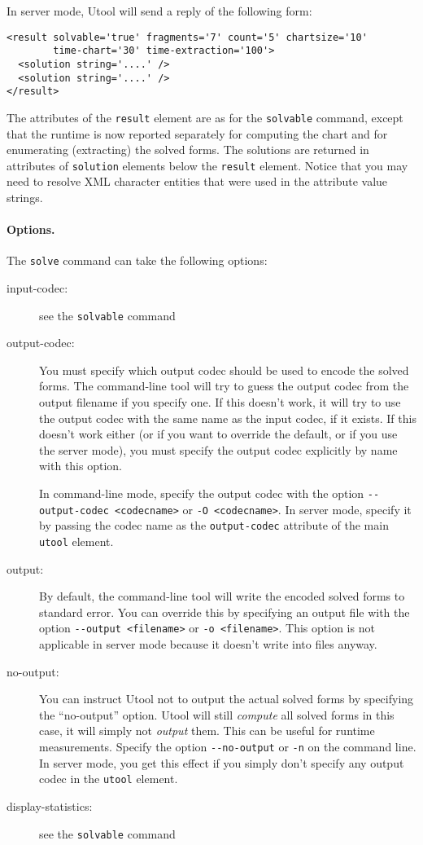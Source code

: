 In server mode, Utool will send a reply of the following form:
\begin{verbatim}
<result solvable='true' fragments='7' count='5' chartsize='10'
        time-chart='30' time-extraction='100'>
  <solution string='....' />
  <solution string='....' />
</result>
\end{verbatim}

The attributes of the \verb?result? element are as for the
\verb?solvable? command, except that the runtime is now reported
separately for computing the chart and for enumerating (extracting)
the solved forms. The solutions are returned in attributes of
\verb?solution? elements below the \verb?result? element. Notice that
you may need to resolve XML character entities that were used in the
attribute value strings.

\paragraph{Options.}
The \verb?solve? command can take the following options:
\begin{description}
\item[input-codec:] see the \verb?solvable? command
\item[output-codec:] You must specify which output codec should be
used to encode the solved forms. The command-line tool will try to
guess the output codec from the output filename if you specify one. If
this doesn't work, it will try to use the output codec with the same
name as the input codec, if it exists. If this doesn't work either (or
if you want to override the default, or if you use the server mode),
you must specify the output codec explicitly by name with this option.

In command-line mode, specify the output codec with the option
\verb?--output-codec <codecname>? or \verb?-O <codecname>?. In server
mode, specify it by passing the codec name as the \verb?output-codec?
attribute of the main \verb?utool? element.

\item[output:] By default, the command-line tool will write the
encoded solved forms to standard error. You can override this by
specifying an output file with the option \verb?--output <filename>?
or \verb?-o <filename>?. This option is not applicable in server
mode because it doesn't write into files anyway.

\item[no-output:] You can instruct Utool not to output the actual
solved forms by specifying the ``no-output'' option. Utool will still
\emph{compute} all solved forms in this case, it will simply not
\emph{output} them. This can be useful for runtime
measurements. Specify the option \verb?--no-output? or \verb?-n? on
the command line. In server mode, you get this effect if you simply
don't specify any output codec in the \verb?utool? element.

\item[display-statistics:] see the \verb?solvable? command
\end{description}





